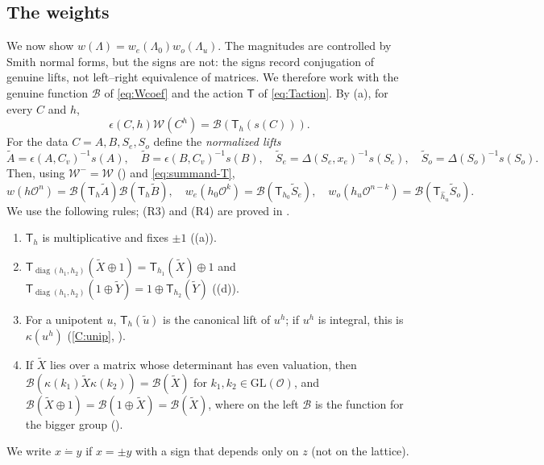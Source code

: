 \documentclass[11pt,oneside,notitlepage]{book}
\numberwithin{equation}{section}
\theoremstyle{plain}
\theoremstyle{definition}
\newcommand{\cO}{\mathcal{O}}
\newcommand{\GL}{\mathrm{GL}}
\newcommand{\cW}{\mathcal{W}}
\newcommand{\cB}{\mathcal{B}}
\newcommand{\diag}{\operatorname{diag}}
\newcommand{\T}{\mathsf{T}}
\renewcommand{\doteqdot}{\mathrel{\dot=}}
\begin{document}
\subsection*{The weights}

We now show $w(\Lambda)=w_e(\Lambda_0)w_o(\Lambda_u)$. The magnitudes are controlled by Smith normal forms, but the signs are not: the signs record conjugation of genuine lifts, not left--right equivalence of matrices. We therefore work with the genuine function $\cB$ of \eqref{eq:Wcoef} and the action $\T$ of \eqref{eq:Taction}. By (a), for every $C$ and $h$,
\begin{equation}\label{eq:summand-T}
\epsilon(C,h)\cW(C^h)=\cB(\T_h(s(C))).
\end{equation}
For the data $C=A,B,S_e,S_o$ define the \emph{normalized lifts}
\[\tilde A=\epsilon(A,C_v)^{-1}s(A),\quad\tilde B=\epsilon(B,C_v)^{-1}s(B),\quad\tilde S_e=\Delta(S_e,x_e)^{-1}s(S_e),\quad\tilde S_o=\Delta(S_o)^{-1}s(S_o).\]
Then, using $\cW^-=\cW$ () and \eqref{eq:summand-T},
\begin{equation}\label{eq:w-B}
w(h\cO^n)=\cB(\T_h\tilde A)\cB(\T_h\tilde B),\quad w_e(h_0\cO^k)=\cB(\T_{h_0}\tilde S_e),\quad w_o(h_u\cO^{n-k})=\cB(\T_{\hat h_u}\tilde S_o).
\end{equation}
We use the following rules; (R3) and (R4) are proved in .
\begin{enumerate}[label=(R\arabic*)]
\item $\T_h$ is multiplicative and fixes $\pm1$ ((a)).
\item $\T_{\diag(h_1,h_2)}(\tilde X\oplus1)=\T_{h_1}(\tilde X)\oplus1$ and $\T_{\diag(h_1,h_2)}(1\oplus\tilde Y)=1\oplus\T_{h_2}(\tilde Y)$ ((d)).
\item For a unipotent $u$, $\T_h(\tilde u)$ is the canonical lift of $u^h$; if $u^h$ is integral, this is $\kappa(u^h)$ (\ref{C:unip}, ).
\item If $\tilde X$ lies over a matrix whose determinant has even valuation, then $\cB(\kappa(k_1)\tilde X\kappa(k_2))=\cB(\tilde X)$ for $k_1,k_2\in\GL(\cO)$, and $\cB(\tilde X\oplus1)=\cB(1\oplus\tilde X)=\cB(\tilde X)$, where on the left $\cB$ is the function for the bigger group ().
\end{enumerate}
We write $x\doteqdot y$ if $x=\pm y$ with a sign that depends only on $z$ (not on the lattice).
\end{document}

